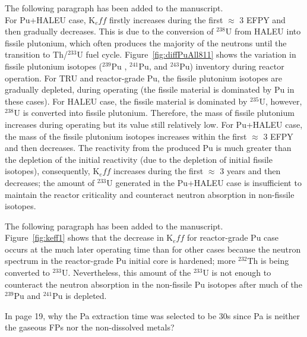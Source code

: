 \documentclass[answers,11pt]{exam}
\begin{document}
\begin{questions}
\begin{solution}
                 The following paragraph has been added to the manuscript.\\
                 For Pu+HALEU case, K${_eff}$ firstly increases during the first $\approx$ $3$ EFPY and then gradually decreases. This is due to the conversion of $^{238}$U from HALEU into fissile plutonium, which often produces the majority of the neutrons until the transition to Th/$^{233}$U fuel cycle. Figure~\ref{fig:diffPuAll811} shows the variation in fissile plutonium isotopes ($^{239}$Pu , $^{241}$Pu, and $^{243}$Pu) inventory during reactor operation. For TRU and reactor-grade Pu, the fissile plutonium isotopes are gradually depleted, during operating (the fissile material is dominated by Pu in these cases). For HALEU case, the fissile material is dominated by $^{235}$U, however, $^{238}$U is converted into fissile plutonium. Therefore, the mass of fissile plutonium increases during operating but its value still relatively low. For Pu+HALEU case, the mass of the fissile plutonium isotopes increases within the first $\approx$ $3$ EFPY and then decreases. The reactivity from the produced Pu is much greater than the depletion of the initial reactivity (due to the depletion of initial fissile isotopes), consequently, K${_eff}$ increases during the first $\approx$ $3$ years and then decreases; the amount of $^{233}$U generated in the Pu+HALEU case is insufficient to maintain the reactor criticality and counteract neutron absorption in non-fissile isotopes.
                 
                 The following paragraph has been added to the manuscript.\\
                 Figure~\ref{fig:keff1} shows that the decrease in K${_eff}$ for reactor-grade Pu case occurs at the much later operating time than for other cases because the neutron spectrum in the reactor-grade Pu initial core is hardened; more $^{232}$Th is being converted to $^{233}$U. Nevertheless, this amount of the $^{233}$U is not enough to counteract the neutron absorption in the non-fissile Pu isotopes after much of the $^{239}$Pu and $^{241}$Pu is depleted.
                 
        \end{solution}

        \question In page 19, why the Pa extraction time was selected to be 30s since Pa is neither the gaseous FPs nor the non-dissolved metals?
        \begin{solution}
                  

\end{solution}
\end{questions}
\end{document}
